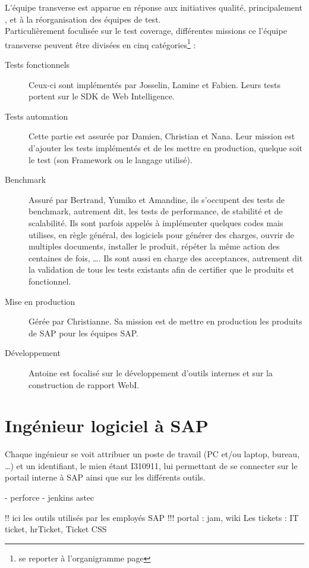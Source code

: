 L'\'{e}quipe transverse est apparue en réponse aux initiatives qualité, principalement , et à la réorganisation des équipes de test.\\
Particuli\`{e}rement foculis\'{e}e sur le test coverage, différentes missions ce l'\'{e}quipe transverse peuvent être divisées en cinq catégories\footnote{se reporter à l'organigramme page \pageref{pdf:org}} :\\

\begin{description}
	\item[Tests fonctionnels] Ceux-ci sont implémentés par Josselin, Lamine et Fabien. Leurs tests portent sur le SDK de Web Intelligence. 
	\item[Tests automation] Cette partie est assurée par Damien, Christian et Nana. Leur mission est d'ajouter les tests implémentés et de les mettre en production, quelque soit le test (son Framework ou le langage utilisé).
	\item[Benchmark] Assuré par Bertrand, Yumiko et Amandine, ils s'occupent des tests de benchmark, autrement dit, les tests de performance, de stabilité et de scalabilité. Ils sont parfois appelés à implémenter quelques codes mais utilises, en règle général, des logiciels pour générer des charges, ouvrir de multiples documents, installer le produit, répéter la même action des centaines de fois, \ldots. Ils sont aussi en charge des acceptances, autrement dit la validation de tous les tests existants afin de certifier que le produits et fonctionnel.
	\item[Mise en production] Gérée par Christianne. Sa mission est de mettre en production les produits de SAP pour les équipes SAP.
	\item[Développement] Antoine est focalisé sur le développement d'outils internes et sur la construction de rapport WebI.
\end{description}





\section{Ing\'{e}nieur logiciel \`{a} SAP}


Chaque ing\'{e}nieur se voit attribuer un poste de travail (PC et/ou laptop, bureau, \ldots) et un identifiant, le mien \'{e}tant I310911, lui permettant de se connecter sur le portail interne \`{a} SAP ainsi que sur les diff\'{e}rents outils.

 - perforce
- jenkins astec

!!  ici les outils utilis\'{e}s par les employ\'{e}s SAP   !!!
portal : jam, wiki
Les tickets : IT ticket, hrTicket, Ticket CSS


